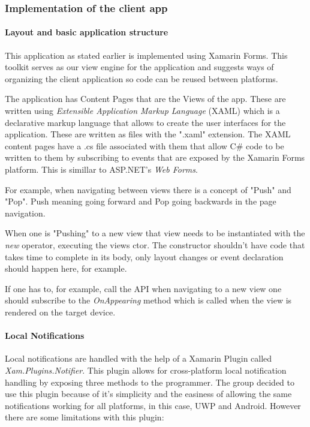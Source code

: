 \subsubsection{Implementation of the client app}

\paragraph{Layout and basic application structure}

This application as stated earlier is implemented using Xamarin Forms. This toolkit serves as our view engine for the application and suggests ways of organizing the client application so code can be reused between platforms.

The application has Content Pages that are the Views of the app. These are written using \textit{Extensible Application Markup Language} (XAML) which is a declarative markup language that allows to create the user interfaces for the application. These are written as files with the ".xaml" extension.
\newline
The XAML content pages have a .cs file associated with them that allow C\# code to be written to them by subscribing to events that are exposed by the Xamarin Forms platform.
This is simillar to ASP.NET's \textit{Web Forms}.

For example, when navigating between views there is a concept of "Push" and "Pop". Push meaning going forward and Pop going backwards in the page navigation.

When one is "Pushing" to a new view that view needs to be instantiated with the \textit{new} operator, executing the views ctor. The constructor shouldn't have code that takes time to complete in its body, only layout changes or event declaration should happen here, for example.

If one has to, for example, call the API when navigating to a new view one should subscribe to the \textit{OnAppearing} method which is called when the view is rendered on the target device.

\paragraph{Local Notifications}

Local notifications are handled with the help of a Xamarin Plugin called \textit{Xam.Plugins.Notifier}. This plugin allows for cross-platform local notification handling by exposing three methods to the programmer.
The group decided to use this plugin because of it's simplicity and the easiness of allowing the same notifications working for all platforms, in this case, UWP and Android. 
However there are some limitations with this plugin:



